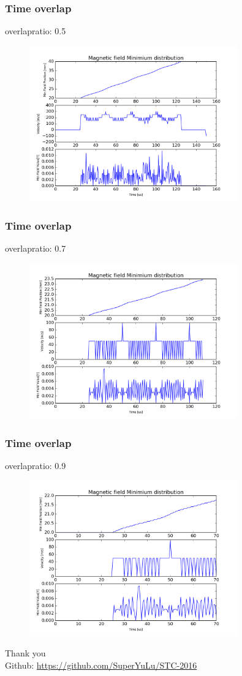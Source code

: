 \documentclass[10pt, xcolor=dvipsnames]{beamer}
\begin{document}
\begin{frame}
  \frametitle{Time overlap}
  overlapratio: 0.5
  \begin{figure}
    \includegraphics[width=0.8\textwidth]{sine_toverlap_5}    
  \end{figure}
\end{frame}

\begin{frame}
  \frametitle{Time overlap}
  overlapratio: 0.7
  \begin{figure}
    \includegraphics[width=0.8\textwidth]{sine_toverlap_7}
  \end{figure}
\end{frame}

\begin{frame}
  \frametitle{Time overlap}
  overlapratio: 0.9
  \begin{figure}
    \includegraphics[width=0.8\textwidth]{sine_toverlap_9}    
  \end{figure}
\end{frame}

\begin{frame}
  \centering
  \Large{Thank you}\\[8mm]
  Github: \url{https://github.com/SuperYuLu/STC-2016}
\end{frame}
\end{document}
